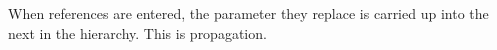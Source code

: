 \item[Propagation]{When references are entered, the parameter they replace 
is carried up into the 
next \gdcase in the hierarchy. This is propagation.
}
